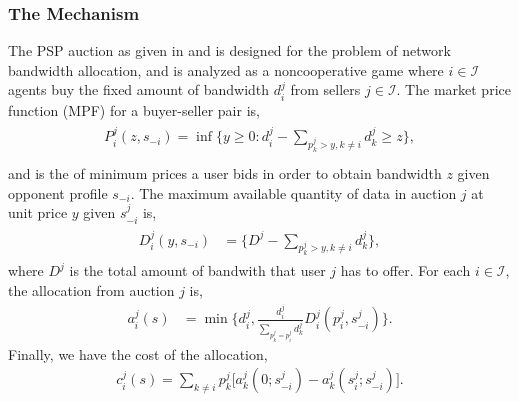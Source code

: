\documentclass[12pt]{article}
\theoremstyle{definition}
\newcommand{\mcI}{\mathcal{I}}
\begin{document}
\begin{multicols}{2}
\subsubsection{The Mechanism}\label{mechanism}
The PSP auction as given in \cite{lazar} and \cite{semret} is designed for the
problem of network bandwidth allocation, and is analyzed as a noncooperative
game where $i\in\mcI$ agents buy the
fixed amount of bandwidth $d_i^j$ from sellers $j\in\mcI$.
The market price function (MPF) for a buyer-seller pair is,
\begin{align}\label{dataprice}
\begin{split}
    P_i^j(z, s_{-i})= \inf\bigg\lbrace y\ge 0 : 
    d_i^j - \sum_{p_k^j>y,k\ne i} d_k^j \ge z \bigg\rbrace,\\
\end{split}
\end{align}
and is the of minimum prices a user bids in
order to obtain bandwidth $z$ given opponent profile $s_{-i}$. 
The maximum available quantity of data in auction
$j$ at unit price $y$ given $s_{-i}^j$ is,
\begin{align}\label{datapriceinverse}
\begin{split}
    D_i^j(y, s_{-i}) &= \bigg\lbrace D^j - \sum_{p_k^j>y,k\ne i} d_k^j  \bigg\rbrace,
\end{split}
\end{align}
where $D^j$ is the total amount of bandwith that user $j$ has to offer.
For each $i \in \mcI$, the allocation from auction $j$ is,
\begin{align}\label{dataallocation}
    a_i^j(s) &= \min\bigg\lbrace d_i^j, 
    \frac{d_i^j}{\sum_{p_k^j= p_i^j}d_k^j} D_i^j(p_i^j,s_{-i}^j)\bigg\rbrace.
\end{align}
Finally, we have the cost of the allocation,
\begin{align}\label{datacost}
    c_i^j(s) = \displaystyle\sum_{k\ne i} 
p_k^j \big[a_k^j(0; s_{-i}^j)
    -a_k^j(s_i^j;s_{-i}^j)\big].
\end{align}


\end{multicols}
\end{document}
